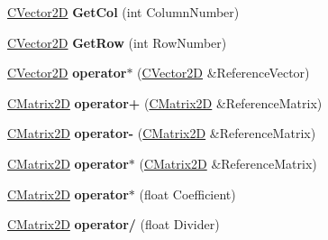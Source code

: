 \begin{DoxyCompactItemize}
\item 
\hyperlink{struct_c_vector2_d}{C\+Vector2D} {\bfseries Get\+Col} (int Column\+Number)\hypertarget{struct_c_matrix2_d_abcdb904b459175227fe2bb0b2f5eea89}{}\label{struct_c_matrix2_d_abcdb904b459175227fe2bb0b2f5eea89}

\item 
\hyperlink{struct_c_vector2_d}{C\+Vector2D} {\bfseries Get\+Row} (int Row\+Number)\hypertarget{struct_c_matrix2_d_a988b0510eabd9ca5ad468e1cdebdec9e}{}\label{struct_c_matrix2_d_a988b0510eabd9ca5ad468e1cdebdec9e}

\item 
\hyperlink{struct_c_vector2_d}{C\+Vector2D} {\bfseries operator$\ast$} (\hyperlink{struct_c_vector2_d}{C\+Vector2D} \&Reference\+Vector)\hypertarget{struct_c_matrix2_d_a410e1788212de8ad607fd2cef82b9330}{}\label{struct_c_matrix2_d_a410e1788212de8ad607fd2cef82b9330}

\item 
\hyperlink{struct_c_matrix2_d}{C\+Matrix2D} {\bfseries operator+} (\hyperlink{struct_c_matrix2_d}{C\+Matrix2D} \&Reference\+Matrix)\hypertarget{struct_c_matrix2_d_abd92fb2cb31631edf9887ff4fb2100ca}{}\label{struct_c_matrix2_d_abd92fb2cb31631edf9887ff4fb2100ca}

\item 
\hyperlink{struct_c_matrix2_d}{C\+Matrix2D} {\bfseries operator-\/} (\hyperlink{struct_c_matrix2_d}{C\+Matrix2D} \&Reference\+Matrix)\hypertarget{struct_c_matrix2_d_a3a99e5bcc1f64e88b15cc1769940c396}{}\label{struct_c_matrix2_d_a3a99e5bcc1f64e88b15cc1769940c396}

\item 
\hyperlink{struct_c_matrix2_d}{C\+Matrix2D} {\bfseries operator$\ast$} (\hyperlink{struct_c_matrix2_d}{C\+Matrix2D} \&Reference\+Matrix)\hypertarget{struct_c_matrix2_d_a6f4c16d27530d1153152da8dde4beca9}{}\label{struct_c_matrix2_d_a6f4c16d27530d1153152da8dde4beca9}

\item 
\hyperlink{struct_c_matrix2_d}{C\+Matrix2D} {\bfseries operator$\ast$} (float Coefficient)\hypertarget{struct_c_matrix2_d_ad8b25e20da7af7e77c2c09bb29a78538}{}\label{struct_c_matrix2_d_ad8b25e20da7af7e77c2c09bb29a78538}

\item 
\hyperlink{struct_c_matrix2_d}{C\+Matrix2D} {\bfseries operator/} (float Divider)\hypertarget{struct_c_matrix2_d_a7f5a093a52f8015bf4e6f6bc376680a9}{}\label{struct_c_matrix2_d_a7f5a093a52f8015bf4e6f6bc376680a9}


\end{DoxyCompactItemize}
